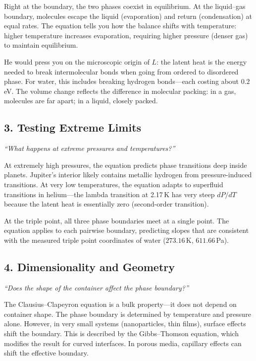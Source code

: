 \documentclass[11pt,openright]{book}
\begin{document}
Right at the boundary, the two phases coexist in equilibrium. At the liquid--gas boundary, molecules escape the liquid (evaporation) and return (condensation) at equal rates. The equation tells you how the balance shifts with temperature: higher temperature increases evaporation, requiring higher pressure (denser gas) to maintain equilibrium.

He would press you on the microscopic origin of $L$: the latent heat is the energy needed to break intermolecular bonds when going from ordered to disordered phase. For water, this includes breaking hydrogen bonds---each costing about $0.2$\,eV. The volume change reflects the difference in molecular packing: in a gas, molecules are far apart; in a liquid, closely packed.

\subsection*{3. Testing Extreme Limits}
\textit{``What happens at extreme pressures and temperatures?''}

At extremely high pressures, the equation predicts phase transitions deep inside planets. Jupiter's interior likely contains metallic hydrogen from pressure-induced transitions. At very low temperatures, the equation adapts to superfluid transitions in helium---the lambda transition at 2.17\,K has very steep $dP/dT$ because the latent heat is essentially zero (second-order transition).

At the triple point, all three phase boundaries meet at a single point. The equation applies to each pairwise boundary, predicting slopes that are consistent with the measured triple point coordinates of water ($273.16$\,K, $611.66$\,Pa).

\subsection*{4. Dimensionality and Geometry}
\textit{``Does the shape of the container affect the phase boundary?''}

The Clausius--Clapeyron equation is a bulk property---it does not depend on container shape. The phase boundary is determined by temperature and pressure alone. However, in very small systems (nanoparticles, thin films), surface effects shift the boundary. This is described by the Gibbs--Thomson equation, which modifies the result for curved interfaces. In porous media, capillary effects can shift the effective boundary.
\end{document}
